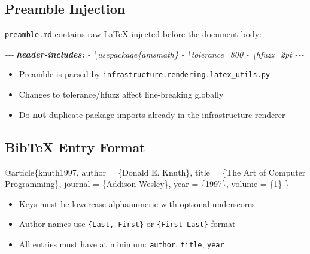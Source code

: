 \documentclass[
]{article}
\newenvironment{Shaded}{}{}
\newcommand{\AnnotationTok}[1]{\textcolor[rgb]{0.38,0.63,0.69}{\textbf{\textit{#1}}}}
\newcommand{\CommentTok}[1]{\textcolor[rgb]{0.38,0.63,0.69}{\textit{#1}}}
\newcommand{\DataTypeTok}[1]{\textcolor[rgb]{0.56,0.13,0.00}{#1}}
\newcommand{\NormalTok}[1]{#1}
\newcommand{\OtherTok}[1]{\textcolor[rgb]{0.00,0.44,0.13}{#1}}
\newcommand{\VariableTok}[1]{\textcolor[rgb]{0.10,0.09,0.49}{#1}}
\providecommand{\tightlist}{%
  \setlength{\itemsep}{0pt}\setlength{\parskip}{0pt}}
\begin{document}
\subsection{Preamble Injection}\label{preamble-injection}

\texttt{preamble.md} contains raw LaTeX injected before the document
body:

\begin{Shaded}
\begin{Highlighting}[]
\CommentTok{{-}{-}{-}}
\AnnotationTok{header{-}includes:}
\CommentTok{  {-} \textbackslash{}usepackage\{amsmath\}}
\CommentTok{  {-} \textbackslash{}tolerance=800}
\CommentTok{  {-} \textbackslash{}hfuzz=2pt}
\CommentTok{{-}{-}{-}}
\end{Highlighting}
\end{Shaded}

\begin{itemize}
\tightlist
\item
  Preamble is parsed by
  \texttt{infrastructure.rendering.latex\_utils.py}
\item
  Changes to tolerance/hfuzz affect line-breaking globally
\item
  Do \textbf{not} duplicate package imports already in the
  infrastructure renderer
\end{itemize}

\subsection{BibTeX Entry Format}\label{bibtex-entry-format}

\begin{Shaded}
\begin{Highlighting}[]
\VariableTok{@article}\NormalTok{\{}\OtherTok{knuth1997}\NormalTok{,}
  \DataTypeTok{author}\NormalTok{  = \{Donald E. Knuth\},}
  \DataTypeTok{title}\NormalTok{   = \{The Art of Computer Programming\},}
  \DataTypeTok{journal}\NormalTok{ = \{Addison{-}Wesley\},}
  \DataTypeTok{year}\NormalTok{    = \{1997\},}
  \DataTypeTok{volume}\NormalTok{  = \{1\}}
\NormalTok{\}}
\end{Highlighting}
\end{Shaded}

\begin{itemize}
\tightlist
\item
  Keys must be lowercase alphanumeric with optional underscores
\item
  Author names use \texttt{\{Last,\ First\}} or \texttt{\{First\ Last\}}
  format
\item
  All entries must have at minimum: \texttt{author}, \texttt{title},
  \texttt{year}
\end{itemize}
\end{document}
